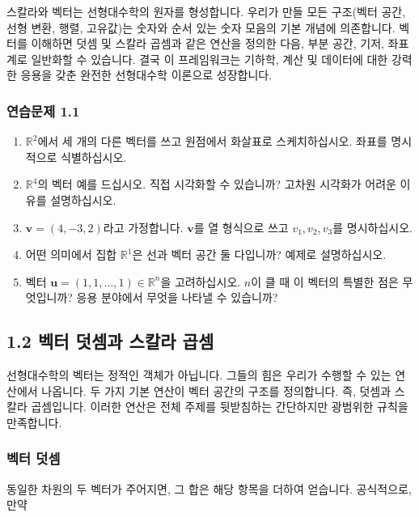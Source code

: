 \documentclass[
  12pt,
  a4paper,
]{article}
\begin{document}
스칼라와 벡터는 선형대수학의 원자를 형성합니다. 우리가 만들 모든 구조(벡터 공간, 선형 변환, 행렬, 고유값)는 숫자와 순서 있는 숫자 모음의 기본 개념에 의존합니다. 벡터를 이해하면 덧셈 및 스칼라 곱셈과 같은 연산을 정의한 다음, 부분 공간, 기저, 좌표계로 일반화할 수 있습니다. 결국 이 프레임워크는 기하학, 계산 및 데이터에 대한 강력한 응용을 갖춘 완전한 선형대수학 이론으로 성장합니다.

\subsubsection{연습문제 1.1}\label{exercises-11}

\begin{enumerate}
\def\labelenumi{\arabic{enumi}.}
\item
  \(\mathbb{R}^2\)에서 세 개의 다른 벡터를 쓰고 원점에서 화살표로 스케치하십시오. 좌표를 명시적으로 식별하십시오.
\item
  \(\mathbb{R}^4\)의 벡터 예를 드십시오. 직접 시각화할 수 있습니까? 고차원 시각화가 어려운 이유를 설명하십시오.
\item
  \(\mathbf{v} = (4, -3, 2)\)라고 가정합니다. \(\mathbf{v}\)를 열 형식으로 쓰고 \(v_1, v_2, v_3\)를 명시하십시오.
\item
  어떤 의미에서 집합 \(\mathbb{R}^1\)은 선과 벡터 공간 둘 다입니까? 예제로 설명하십시오.
\item
  벡터 \(\mathbf{u} = (1,1,\dots,1) \in \mathbb{R}^n\)을 고려하십시오. \(n\)이 클 때 이 벡터의 특별한 점은 무엇입니까? 응용 분야에서 무엇을 나타낼 수 있습니까?
\end{enumerate}

\subsection{1.2 벡터 덧셈과 스칼라
곱셈}\label{12-vector-addition-and-scalar-multiplication}

선형대수학의 벡터는 정적인 객체가 아닙니다. 그들의 힘은 우리가 수행할 수 있는 연산에서 나옵니다. 두 가지 기본 연산이 벡터 공간의 구조를 정의합니다. 즉, 덧셈과 스칼라 곱셈입니다.
이러한 연산은 전체 주제를 뒷받침하는 간단하지만 광범위한 규칙을 만족합니다.

\subsubsection{벡터 덧셈}\label{vector-addition}

동일한 차원의 두 벡터가 주어지면, 그 합은 해당 항목을 더하여 얻습니다. 공식적으로, 만약
\end{document}
